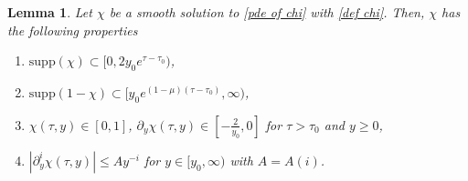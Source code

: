 \documentclass{article}
\newcommand{\pa}{\partial}
\numberwithin{equation}{section}
\newtheorem{lemma}[theorem]{Lemma}
\begin{document}
\begin{lemma}\label{le: supp chi}
Let $\chi$ be a smooth solution to %
\eqref{pde of chi} with \eqref{def chi}. 
Then, $\chi$ has the following properties
\begin{enumerate}
\item[$(1)$]  $\text{supp}(\chi)\subset [0, 2y_0e^{\tau-\tau_0}) $,
\item[$(2)$] $\text{supp}(1-\chi)\subset [y_0e^{(1-\mu)(\tau-\tau_0)},\infty) $,
\item[$(3)$] $\chi(\tau,y)\in[0,1]$, $\pa_y \chi(\tau,y)\in[-\frac{2}{y_0},0]$ for $\tau>\tau_0$ and $y\geq0$,
\item[$(4)$] $|\pa_y^i \chi(\tau,y) |\leq A y^{-i}$ for $y\in[y_0,\infty)$ with $A=A(i)$.
\end{enumerate}
\end{lemma}
\end{document}
